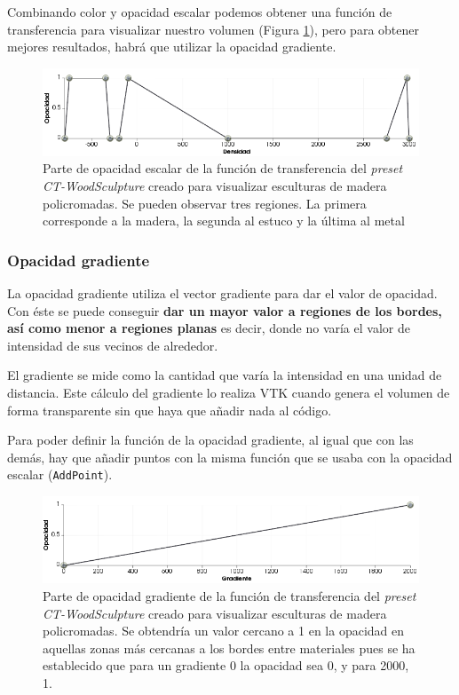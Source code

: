 Combinando color y opacidad escalar podemos obtener una función de transferencia para visualizar nuestro volumen (Figura \ref{fig:opacity_tf}), pero para obtener mejores resultados, habrá que utilizar la opacidad gradiente. 

\begin{figure}[H]
	\centering
	\includegraphics[width=12.5cm]{imagenes/opacity_tf}
	\caption{Parte de opacidad escalar de la función de transferencia del \textit{preset} \textit{CT-WoodSculpture} creado para visualizar esculturas de madera policromadas. Se pueden observar tres regiones. La primera corresponde a la madera, la segunda al estuco y la última al metal}
	\label{fig:opacity_tf}
\end{figure}

\subsubsection{Opacidad gradiente}

La opacidad gradiente utiliza el vector gradiente para dar el valor de opacidad. Con éste se puede conseguir \textbf{dar un mayor valor a regiones de los bordes, así como menor a regiones planas} es decir, donde no varía el valor de intensidad de sus vecinos de alrededor.

El gradiente se mide como la cantidad que varía la intensidad en una unidad de distancia. Este cálculo del gradiente lo realiza VTK cuando genera el volumen de forma transparente sin que haya que añadir nada al código.

Para poder definir la función de la opacidad gradiente, al igual que con las demás, hay que añadir puntos con la misma función que se usaba con la opacidad escalar (\texttt{AddPoint}). 

\begin{figure}[H]
	\centering
	\includegraphics[width=12.5cm]{imagenes/gradient_tf}
	\caption{Parte de opacidad gradiente de la función de transferencia del \textit{preset} \textit{CT-WoodSculpture} creado para visualizar esculturas de madera policromadas. Se obtendría un valor cercano a 1 en la opacidad en aquellas zonas más cercanas a los bordes entre materiales pues se ha establecido que para un gradiente 0 la opacidad sea 0, y para 2000, 1. }
	\label{fig:gradient_tf}
\end{figure}

